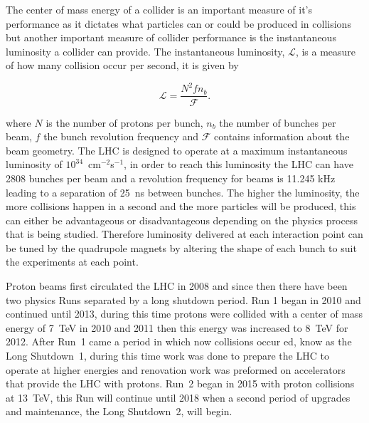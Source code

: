 The center of mass energy of a collider is an important measure of it's performance as it dictates what particles can or could be produced in collisions but another important measure of collider performance is the instantaneous luminosity a collider can provide. The instantaneous luminosity, $\mathcal{L}$, is a measure of how many collision occur per second, it is given by

\begin{equation}
\mathcal{L} = \frac{N^{2} f n_{b}}{\mathcal{F}}.
\label{eq:inst_lumi}
\end{equation}


where $N$ is the number of protons per bunch, $n_{b}$ the number of bunches per beam, $f$ the bunch revolution frequency and $\mathcal{F}$ contains information about the beam geometry. The LHC is designed to operate at a maximum instantaneous luminosity of $10^{34}$~cm$^{-2}$s$^{-1}$, in order to reach this luminosity the LHC can have 2808 bunches per beam and a revolution frequency for beams is 11.245 kHz leading to a separation of 25~ns between bunches. The higher the luminosity, the more collisions happen in a second and the more particles will be produced, this can either be advantageous or disadvantageous depending on the physics process that is being studied.
Therefore luminosity delivered at each interaction point can be tuned by the quadrupole magnets by altering the shape of each bunch to suit the experiments at each point.

Proton beams first circulated the LHC in 2008 and since then there have been two physics Runs separated by a long shutdown period. Run 1 began in 2010 and continued until 2013, during this time protons were collided with a center of mass energy of 7~TeV in 2010 and 2011 then this energy was increased to 8~TeV for 2012. After Run~1 came a period in which now collisions occur ed, know as the Long Shutdown~1, during this time work was done to prepare the LHC to operate at higher energies and renovation work was preformed on accelerators that provide the LHC with protons. Run~2 began in 2015 with proton collisions at 13~TeV, %
this Run will continue until 2018 when a second period of upgrades and maintenance, the Long Shutdown~2, will begin.




